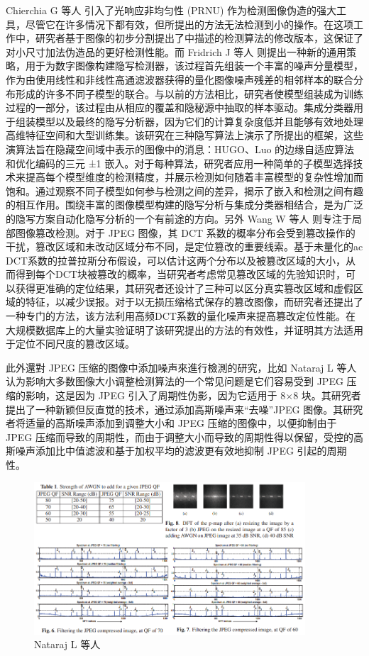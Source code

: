 Chierchia G 等人 \cite{chierchia2011prnu} 引入了光响应非均匀性 (PRNU) 作为检测图像伪造的强大工具，尽管它在许多情况下都有效，但所提出的方法无法检测到小的操作。在这项工作中，研究者基于图像的初步分割提出了中描述的检测算法的修改版本，这保证了对小尺寸加法伪造品的更好检测性能。而 Fridrich J 等人 \cite{fridrich2012rich} 则提出一种新的通用策略，用于为数字图像构建隐写检测器，该过程首先组装一个丰富的噪声分量模型，作为由使用线性和非线性高通滤波器获得的量化图像噪声残差的相邻样本的联合分布形成的许多不同子模型的联合。与以前的方法相比，研究者使模型组装成为训练过程的一部分，该过程由从相应的覆盖和隐秘源中抽取的样本驱动。集成分类器用于组装模型以及最终的隐写分析器，因为它们的计算复杂度低并且能够有效地处理高维特征空间和大型训练集。该研究在三种隐写算法上演示了所提出的框架，这些演算法旨在隐藏空间域中表示的图像中的消息：HUGO、Luo 的边缘自适应算法和优化编码的三元 ±1 嵌入。对于每种算法，研究者应用一种简单的子模型选择技术来提高每个模型维度的检测精度，并展示检测如何随着丰富模型的复杂性增加而饱和。通过观察不同子模型如何参与检测之间的差异，揭示了嵌入和检测之间有趣的相互作用。围绕丰富的图像模型构建的隐写分析与集成分类器相结合，是为广泛的隐写方案自动化隐写分析的一个有前途的方向。另外 Wang W 等人 \cite{wang2014exploring} 则专注于局部图像篡改检测。对于 JPEG 图像，其 DCT 系数的概率分布会受到篡改操作的干扰，篡改区域和未改动区域分布不同，是定位篡改的重要线索。基于未量化的ac DCT系数的拉普拉斯分布假设，可以估计这两个分布以及被篡改区域的大小，从而得到每个DCT块被篡改的概率，当研究者考虑常见篡改区域的先验知识时，可以获得更准确的定位结果，其研究者还设计了三种可以区分真实篡改区域和虚假区域的特征，以减少误报。对于以无损压缩格式保存的篡改图像，而研究者还提出了一种专门的方法，该方法利用高频DCT系数的量化噪声来提高篡改定位性能。在大规模数据库上的大量实验证明了该研究提出的方法的有效性，并证明其方法适用于定位不同尺度的篡改区域。

此外還對 JPEG 压缩的图像中添加噪声來進行檢測的研究，比如 Nataraj L 等人 \cite{nataraj2009adding} 认为影响大多数图像大小调整检测算法的一个常见问题是它们容易受到 JPEG 压缩的影响，这是因为 JPEG 引入了周期性伪影，因为它适用于 8×8 块。其研究者提出了一种新颖但反直觉的技术，通过添加高斯噪声来“去噪”JPEG 图像。其研究者将适量的高斯噪声添加到调整大小和 JPEG 压缩的图像中，以便抑制由于 JPEG 压缩而导致的周期性，而由于调整大小而导致的周期性得以保留，受控的高斯噪声添加比中值滤波和基于加权平均的滤波更有效地抑制 JPEG 引起的周期性。

\begin{figure}[htb]
\centering 
\includegraphics[width=0.90\textwidth]{img/ch3m4.png} 
\caption{Nataraj L 等人 \cite{nataraj2009adding}}
\label{Test}
\end{figure}

